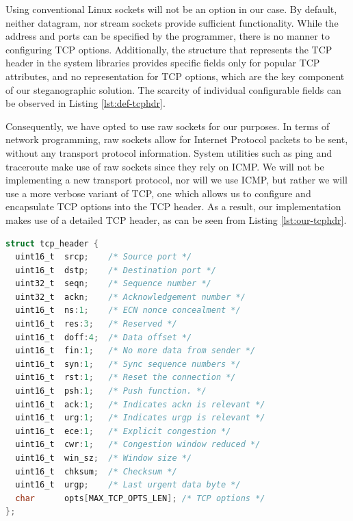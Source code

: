 Using conventional Linux sockets will not be an option in our case. By default,
neither datagram, nor stream sockets provide sufficient functionality. While the
address and ports can be specified by the programmer, there is no manner to
configuring TCP options. Additionally, the structure that represents the TCP header
in the system libraries provides specific fields only for popular TCP attributes,
and no representation for TCP options, which are the key component of our
steganographic solution. The scarcity of individual configurable fields can be
observed in Listing \ref{lst:def-tcphdr}.

Consequently, we have opted to use raw sockets for our purposes. In terms of
network programming, raw sockets allow for Internet Protocol packets to be sent,
without any transport protocol information. System utilities such as ping and
traceroute make use of raw sockets since they rely on ICMP. We will not be
implementing a new transport protocol, nor will we use ICMP, but rather we will
use a more verbose variant of TCP, one which allows us to configure and
encapsulate TCP options into the TCP header. As a result, our implementation
makes use of a detailed TCP header, as can be seen from Listing \ref{lst:our-tcphdr}.

\begin{lstlisting}[caption={Verbose TCP Header Structure},
                   label={lst:our-tcphdr},
                   basicstyle=\footnotesize,
                   captionpos=b,
                   frame=single,
                   language=C
                  ]
struct tcp_header {
  uint16_t  srcp;    /* Source port */
  uint16_t  dstp;    /* Destination port */
  uint32_t  seqn;    /* Sequence number */
  uint32_t  ackn;    /* Acknowledgement number */
  uint16_t  ns:1;    /* ECN nonce concealment */
  uint16_t  res:3;   /* Reserved */
  uint16_t  doff:4;  /* Data offset */
  uint16_t  fin:1;   /* No more data from sender */
  uint16_t  syn:1;   /* Sync sequence numbers */
  uint16_t  rst:1;   /* Reset the connection */
  uint16_t  psh:1;   /* Push function. */
  uint16_t  ack:1;   /* Indicates ackn is relevant */
  uint16_t  urg:1;   /* Indicates urgp is relevant */
  uint16_t  ece:1;   /* Explicit congestion */
  uint16_t  cwr:1;   /* Congestion window reduced */
  uint16_t  win_sz;  /* Window size */
  uint16_t  chksum;  /* Checksum */
  uint16_t  urgp;    /* Last urgent data byte */
  char      opts[MAX_TCP_OPTS_LEN]; /* TCP options */
};
\end{lstlisting}

